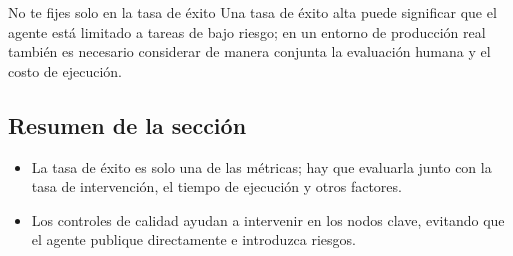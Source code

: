 \begin{warningbox}{No te fijes solo en la tasa de éxito}
Una tasa de éxito alta puede significar que el agente está limitado a tareas de bajo riesgo; en un entorno de producción real también es necesario considerar de manera conjunta la evaluación humana y el costo de ejecución.
\end{warningbox}

\subsection{Resumen de la sección}
\begin{itemize}
    \item La tasa de éxito es solo una de las métricas; hay que evaluarla junto con la tasa de intervención, el tiempo de ejecución y otros factores.
    \item Los controles de calidad ayudan a intervenir en los nodos clave, evitando que el agente publique directamente e introduzca riesgos.
\end{itemize}
